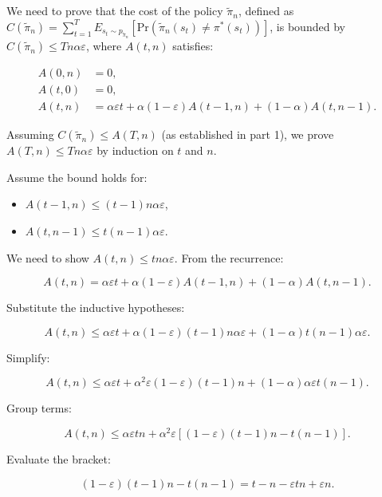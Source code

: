 \documentclass[12pt,oneside]{book}
\begin{document}
\subsection{ }
We need to prove that the cost of the policy \(\tilde{\pi}_n\), defined as \( C(\tilde{\pi}_n) 
= \sum_{t=1}^T E_{s_t \sim p_{\tilde{\pi}_n}} [\text{Pr}(\tilde{\pi}_n(s_t) \neq \pi^*(s_t))] \), 
is bounded by \( C(\tilde{\pi}_n) \leq T n \alpha \varepsilon \), where \( A(t, n) \) satisfies:

\begin{align*}
A(0, n) &= 0, \\
A(t, 0) &= 0, \\
A(t, n) &= \alpha \varepsilon t + \alpha (1 - \varepsilon) A(t - 1, n) + (1 - \alpha) A(t, n - 1).
\end{align*}

Assuming \( C(\tilde{\pi}_n) \leq A(T, n) \) (as established in part 1), 
we prove \( A(T, n) \leq T n \alpha \varepsilon \) by induction on \( t \) and \( n \).

Assume the bound holds for:
\begin{itemize}
    \item \( A(t - 1, n) \leq (t - 1) n \alpha \varepsilon \),
    \item \( A(t, n - 1) \leq t (n - 1) \alpha \varepsilon \).
\end{itemize}

We need to show \( A(t, n) \leq t n \alpha \varepsilon \). From the recurrence:

\[
A(t, n) = \alpha \varepsilon t + \alpha (1 - \varepsilon) A(t - 1, n) + (1 - \alpha) A(t, n - 1).
\]

Substitute the inductive hypotheses:

\[
A(t, n) \leq \alpha \varepsilon t + \alpha (1 - \varepsilon) (t - 1) n \alpha \varepsilon + (1 - \alpha) t (n - 1) \alpha \varepsilon.
\]

Simplify:

\[
A(t, n) \leq \alpha \varepsilon t + \alpha^2 \varepsilon (1 - \varepsilon) (t - 1) n + (1 - \alpha) \alpha \varepsilon t (n - 1).
\]

Group terms:

\[
A(t, n) \leq \alpha \varepsilon t n + \alpha^2 \varepsilon [ (1 - \varepsilon) (t - 1) n - t (n - 1) ].
\]

Evaluate the bracket:

\[
(1 - \varepsilon) (t - 1) n - t (n - 1) = t - n - \varepsilon t n + \varepsilon n.
\]
\end{document}

